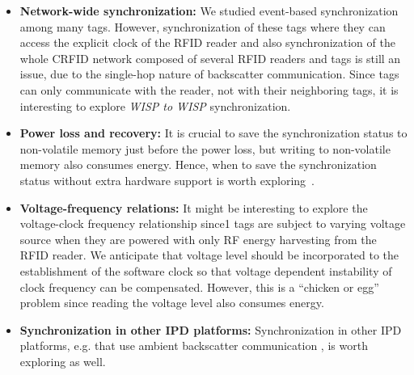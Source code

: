 \documentclass[10pt,journal,compsoc]{IEEEtran}
\begin{document}
\begin{itemize}
	\item \textbf{Network-wide synchronization:} We studied event-based synchronization among many tags. However, synchronization of these tags where they can access the explicit clock of the RFID reader and also synchronization of the whole CRFID network composed of several RFID readers and tags is still an issue, due to the single-hop nature of backscatter communication. Since tags can only communicate with the reader, not with their neighboring tags, it is interesting to explore \emph{WISP to WISP} synchronization. 
	
	\item \textbf{Power loss and recovery:} It is crucial to save the synchronization status to non-volatile memory just before the power loss, but writing to non-volatile memory also consumes energy. Hence, when to save the synchronization status without extra hardware support is worth exploring~\cite{Buettner:2011:Dewdrop,Ransford:2011:Mementos,Lucia:2015:Execution,Colin:2016:Debugger}.
	
	\item \textbf{Voltage-frequency relations:} It might be interesting to explore the voltage-clock frequency relationship since1 tags are subject to varying voltage source when they are powered with only RF energy harvesting from the RFID reader. We anticipate that voltage level should be incorporated to the establishment of the software clock so that voltage dependent instability of clock frequency can be compensated. However, this is a ``chicken or egg'' problem since reading the voltage level also consumes energy. 
	
	\item \textbf{Synchronization in other IPD platforms:} Synchronization in other IPD platforms, e.g. that use ambient backscatter communication \cite{ambient_backscatter}, is worth exploring as well. 
\end{itemize}

\ifCLASSOPTIONcaptionsoff
  \newpage
\fi




%

% 
\end{document}
